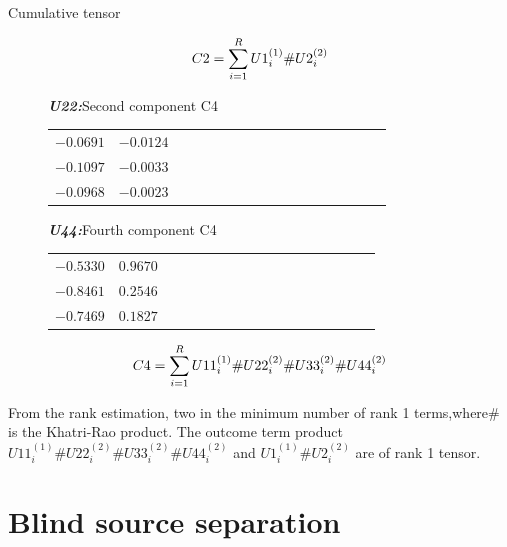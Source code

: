 \documentclass[t,12pt,english
\ifx\beamermode\undefined\else,\beamermode\fi
]{beamer}
\begin{document}
\begin{frame}{Cumulative tensor}
\begin{figure}[!htb]
 
\begin{equation}\tiny
C2=\sum_{i=1}^{R}U1_{i}^{(1)}\#U2_{i}^{(2)}
\end{equation}
 


\endminipage
{}
\centering
  \begin{table}[!htbp]
\tiny\centering
\tiny{\textbf{\textit{U22:}}Second component C4}\\
\begin{tabular}{c c c c c c c c c c c c c c c c c} 
  \hline  
   $-0.0691$&$-0.0124$\\
   $-0.1097$&$-0.0033$\\
   $-0.0968$&$-0.0023$\\
 \hline
\end{tabular}
\end{table} 

  \begin{table}[!htbp]
\tiny\centering
\tiny{\textbf{\textit{U44:}}Fourth component C4}\\
\begin{tabular}{c c c c c c c c c c c c c c c c c}
 \hline  
   $-0.5330$&$ 0.9670$\\
   $-0.8461$&$ 0.2546$\\
   $-0.7469$&$ 0.1827$\\
 \hline
\end{tabular}
\end{table}


\begin{equation}\tiny
C4=\sum_{i=1}^{R}U11_{i}^{(1)}\#U22_{i}^{(2)}\#U33_{i}^{(2)}\#U44_{i}^{(2)}
\end{equation}



\endminipage
\end{figure}


\tiny{From the rank estimation, two in the minimum number of rank 1 terms,where$\#$ is the Khatri-Rao product. The outcome term product $U11_{i}^{(1)}\#U22_{i}^{(2)}\#U33_{i}^{(2)}\#U44_{i}^{(2)}$ and $U1_{i}^{(1)}\#U2_{i}^{(2)}$ are of rank 1 tensor. }



\end{frame}

\section{Blind source separation}
\end{document}
